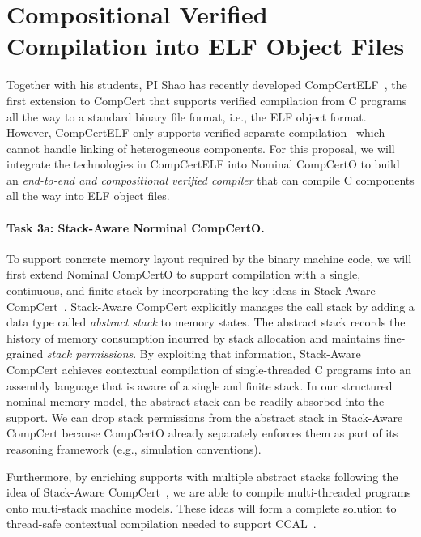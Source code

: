\section{Compositional Verified Compilation into ELF Object Files}

Together with his students, PI Shao has recently developed
CompCertELF~\cite{compcertelf20}, the first extension to CompCert that
supports verified compilation from C programs all the way to a
standard binary file format, i.e., the ELF object format.  However,
CompCertELF only supports verified separate
compilation~\cite{sepcompcert} which cannot handle linking of
heterogeneous components.  For this proposal, we will integrate the
technologies in CompCertELF into Nominal CompCertO to build an {\em
  end-to-end and compositional verified compiler} that can compile C
components all the way into ELF object files.

\paragraph*{Task 3a: Stack-Aware Norminal CompCertO.}
To support concrete memory layout required by the binary machine code,
we will first extend Nominal CompCertO to support compilation with a
single, continuous, and finite stack by incorporating the key ideas in
Stack-Aware CompCert~\cite{wang2019,compcertelf20}.  Stack-Aware
CompCert explicitly manages the call stack by adding a data type
called \emph{abstract stack} to memory states. The abstract stack
records the history of memory consumption incurred by stack allocation
and maintains fine-grained \emph{stack permissions}. By exploiting
that information, Stack-Aware CompCert achieves contextual compilation
of single-threaded C programs into an assembly language that is aware
of a single and finite stack.  In our structured nominal memory model,
the abstract stack can be readily absorbed into the support. We can
drop stack permissions from the abstract stack in Stack-Aware CompCert
because CompCertO already separately enforces them as part of its
reasoning framework (e.g., simulation conventions).

Furthermore, by enriching supports with multiple
abstract stacks following the idea of Stack-Aware
CompCert~\cite{wang2019}, we are able to compile multi-threaded
programs onto multi-stack machine models. These ideas will form a complete
solution to thread-safe contextual compilation needed to support
CCAL~\cite{ccal18}.


